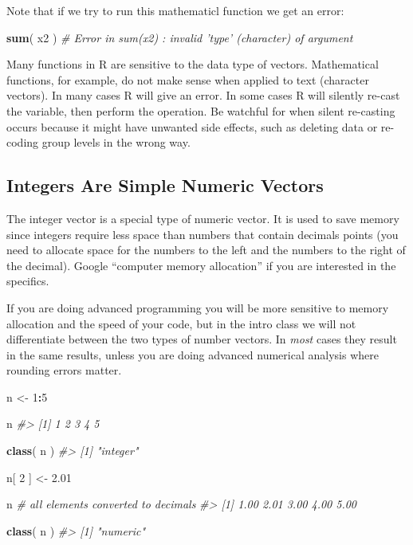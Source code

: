 \documentclass[]{book}
\newenvironment{Shaded}{\begin{snugshade}}{\end{snugshade}}
\newcommand{\CommentTok}[1]{\textcolor[rgb]{0.56,0.35,0.01}{\textit{#1}}}
\newcommand{\DecValTok}[1]{\textcolor[rgb]{0.00,0.00,0.81}{#1}}
\newcommand{\FloatTok}[1]{\textcolor[rgb]{0.00,0.00,0.81}{#1}}
\newcommand{\KeywordTok}[1]{\textcolor[rgb]{0.13,0.29,0.53}{\textbf{#1}}}
\newcommand{\NormalTok}[1]{#1}
\newcommand{\OperatorTok}[1]{\textcolor[rgb]{0.81,0.36,0.00}{\textbf{#1}}}
\newcommand{\StringTok}[1]{\textcolor[rgb]{0.31,0.60,0.02}{#1}}
\theoremstyle{definition}
\theoremstyle{definition}
\theoremstyle{definition}
\theoremstyle{remark}
\begin{document}
Note that if we try to run this mathematicl function we get an error:

\begin{Shaded}
\begin{Highlighting}[]

\KeywordTok{sum}\NormalTok{( x2 ) }\CommentTok{# Error in sum(x2) : invalid 'type' (character) of argument}
\end{Highlighting}
\end{Shaded}

Many functions in R are sensitive to the data type of vectors.
Mathematical functions, for example, do not make sense when applied to
text (character vectors). In many cases R will give an error. In some
cases R will silently re-cast the variable, then perform the operation.
Be watchful for when silent re-casting occurs because it might have
unwanted side effects, such as deleting data or re-coding group levels
in the wrong way.

\hypertarget{integers-are-simple-numeric-vectors}{%
\subsection{Integers Are Simple Numeric
Vectors}\label{integers-are-simple-numeric-vectors}}

The integer vector is a special type of numeric vector. It is used to
save memory since integers require less space than numbers that contain
decimals points (you need to allocate space for the numbers to the left
and the numbers to the right of the decimal). Google ``computer memory
allocation'' if you are interested in the specifics.

If you are doing advanced programming you will be more sensitive to
memory allocation and the speed of your code, but in the intro class we
will not differentiate between the two types of number vectors. In
\emph{most} cases they result in the same results, unless you are doing
advanced numerical analysis where rounding errors matter.

\begin{Shaded}
\begin{Highlighting}[]

\NormalTok{n <-}\StringTok{ }\DecValTok{1}\OperatorTok{:}\DecValTok{5}

\NormalTok{n}
\CommentTok{#> [1] 1 2 3 4 5}

\KeywordTok{class}\NormalTok{( n )}
\CommentTok{#> [1] "integer"}

\NormalTok{n[ }\DecValTok{2}\NormalTok{ ] <-}\StringTok{ }\FloatTok{2.01}

\NormalTok{n  }\CommentTok{# all elements converted to decimals}
\CommentTok{#> [1] 1.00 2.01 3.00 4.00 5.00}

\KeywordTok{class}\NormalTok{( n )}
\CommentTok{#> [1] "numeric"}
\end{Highlighting}
\end{Shaded}
\end{document}
